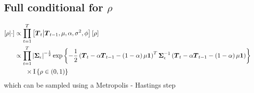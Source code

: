 \documentclass{article}\usepackage[]{graphicx}\usepackage[]{color}
\def\bm#1{\mbox{\boldmath $#1$}}
\begin{document}
\subsection{Full conditional for $\rho$}
%
\begin{align*}
%
\left[ \rho \middle| \cdot \right] & \propto \prod_{t = 1}^T \left[ \bm{T}_t \middle| \bm{T}_{t - 1}, \mu, \alpha, \sigma^2, \phi \right] \left[ \rho \right]\\
%
& \propto \prod_{t = 1}^T \left| \bm{\Sigma}_\epsilon \right|^{ - \frac{1} {2} } \exp{ \left\{ - \frac{1} {2} \left( \bm{T}_t  - \alpha \bm{T}_{t - 1} - \left( 1 - \alpha \right) \mu \bm{1} \right)^T \bm{\Sigma}_\epsilon^{ - 1} \left( \bm{T}_t  - \alpha \bm{T}_{t - 1} - \left( 1 - \alpha \right) \mu \bm{1} \right) \right\} }\\
& \hspace{6mm} \times \mbox{I}\left\{ \rho \in \left( 0, 1 \right) \right\} \\
%
\end{align*}
%
which can be sampled using a Metropolis - Hastings step
%
%
%
%
\end{document}
